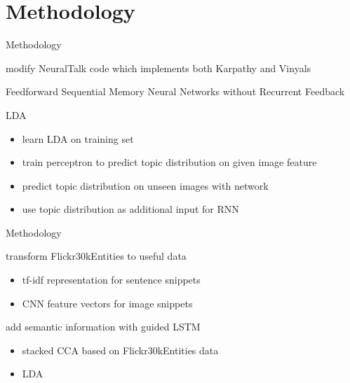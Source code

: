 \documentclass[16pt]{beamer}
\newenvironment{wideitemize}{\itemize\addtolength{\itemsep}{10pt}}{\enditemize}
\begin{document}


\section{Methodology}%

\begin{frame}{Methodology}
\begin{wideitemize}
\item modify NeuralTalk code which implements both Karpathy and Vinyals
\item Feedforward Sequential Memory Neural Networks without Recurrent Feedback %
\item LDA
\begin{itemize}
\item learn LDA on training set
\item train perceptron to predict topic distribution on given image feature
\item predict topic distribution on unseen images with network
\item use topic distribution as additional input for RNN
\end{itemize}
\end{wideitemize}
\end{frame}

\begin{frame}{Methodology}
\begin{wideitemize}
\item transform Flickr30kEntities to useful data
\begin{itemize}
\item tf-idf representation for sentence snippets
\item CNN feature vectors for image snippets
\end{itemize}
\item add semantic information with guided LSTM
\begin{itemize}
    \item stacked CCA based on Flickr30kEntities data
    \item LDA
\end{itemize}
\end{wideitemize}
\end{frame}


\end{document}
